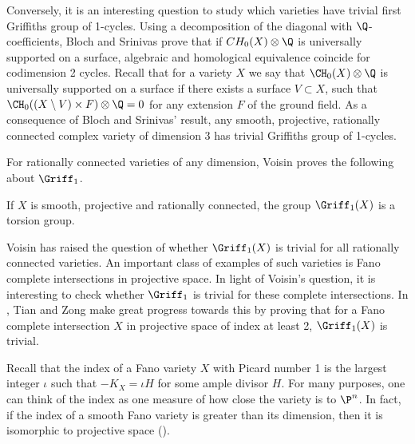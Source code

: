 Conversely, it is an interesting question to study which varieties have trivial first Griffiths group of 1-cycles. Using a decomposition of the diagonal with $\Q$-coefficients, Bloch and Srinivas \cite{BSCorrespondences} prove that if $CH_0(X) \otimes \Q$ is universally supported on a surface,
algebraic and homological equivalence coincide for codimension 2 cycles. Recall that for a variety $X$ we say that $\CH_0(X) \otimes \Q$ is universally supported on a surface if there exists a surface $V \subset X$, such that $\CH_0((X \setminus V) \times F) \otimes \Q = 0$ for any extension $F$ of the ground field.
As a consequence of Bloch and Srinivas' result, any smooth, projective, rationally connected complex variety of dimension 3 has trivial Griffiths group of 1-cycles.

For rationally connected varieties of any dimension, Voisin proves the following about $\Griff_1$.
\begin{theorem}
	If $X$ is smooth, projective and rationally connected, the group $\Griff_1(X)$ is a torsion group.
\end{theorem}

 Voisin has raised the question of whether $\Griff_1(X)$ is trivial for all rationally connected varieties. An important class of examples of such varieties is Fano complete intersections in projective space. In light of Voisin's question, it is interesting to check whether $\Griff_1$ is trivial for these complete intersections. In \cite{TZ}, Tian and Zong make great progress towards this by proving that for a Fano complete intersection $X$ in projective space of index at least 2, $\Griff_1(X)$ is trivial.
 
 Recall that the index of a Fano variety $X$ with Picard number 1 is the largest integer $\iota$ such that $-K_X = \iota H$ for some ample divisor $H$. For many purposes, one can think of the index as one measure of how close the variety is to $\P^n$. In fact, if the index of a smooth Fano variety is greater than its dimension, then it is isomorphic to projective space (\cite{KO}).


